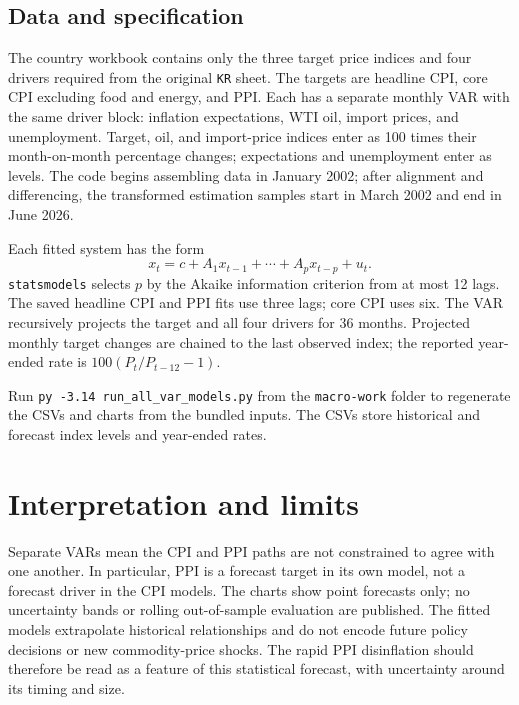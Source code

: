 \documentclass[11pt,a4paper]{article}
\begin{document}
\subsection{Data and specification}
The country workbook contains only the three target price indices and four drivers required from the original \texttt{KR} sheet. The targets are headline CPI, core CPI excluding food and energy, and PPI. Each has a separate monthly VAR with the same driver block: inflation expectations, WTI oil, import prices, and unemployment. Target, oil, and import-price indices enter as 100 times their month-on-month percentage changes; expectations and unemployment enter as levels. The code begins assembling data in January 2002; after alignment and differencing, the transformed estimation samples start in March 2002 and end in June 2026.

Each fitted system has the form
\[
  x_t=c+A_1x_{t-1}+\cdots+A_px_{t-p}+u_t.
\]
\texttt{statsmodels} selects $p$ by the Akaike information criterion from at most 12 lags. The saved headline CPI and PPI fits use three lags; core CPI uses six. The VAR recursively projects the target and all four drivers for 36 months. Projected monthly target changes are chained to the last observed index; the reported year-ended rate is $100(P_t/P_{t-12}-1)$.

Run \texttt{py -3.14 run\_all\_var\_models.py} from the \texttt{macro-work} folder to regenerate the CSVs and charts from the bundled inputs. The CSVs store historical and forecast index levels and year-ended rates.

\section{Interpretation and limits}
Separate VARs mean the CPI and PPI paths are not constrained to agree with one another. In particular, PPI is a forecast target in its own model, not a forecast driver in the CPI models. The charts show point forecasts only; no uncertainty bands or rolling out-of-sample evaluation are published. The fitted models extrapolate historical relationships and do not encode future policy decisions or new commodity-price shocks. The rapid PPI disinflation should therefore be read as a feature of this statistical forecast, with uncertainty around its timing and size.
\end{document}
